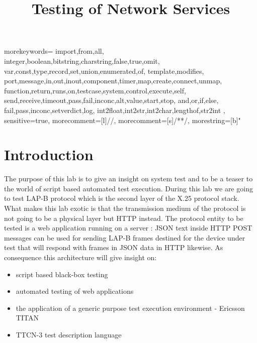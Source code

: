 \documentclass[a4paper]{article}
\title{Testing of Network Services}
\author{}
\date{}
\begin{document}
{
  morekeywords={
    import,from,all,
    integer,boolean,bitstring,charstring,false,true,omit,
    var,const,type,record,set,union,enumerated,of,
    template,modifies,
    port,message,in,out,inout,component,timer,map,create,connect,unmap,
    function,return,runs,on,testcase,system,control,execute,self,
    send,receive,timeout,pass,fail,inconc,alt,value,start,stop,
    and,or,if,else,
    fail,pass,inconc,setverdict,log,
    int2float,int2str,int2char,lengthof,str2int
  },
  sensitive=true, %
  morecomment=[l]{//}, %
  morecomment=[s]{/*}{*/}, %
  morestring=[b]" %
}
\lstset{language=TTCN3}
\lstset{frame=single}
\lstset{breaklines=true}

\maketitle

\tableofcontents

\section{Introduction}

The purpose of this lab is to give an insight on system test and to be a teaser to the world of script based automated
test execution. During this lab we are going to test LAP-B protocol which is the second layer of the X.25 protocol
stack. What makes this lab exotic is that the transmission medium of the protocol is not going to be a physical layer
but HTTP instead. The protocol entity to be tested is a web application running on a server : JSON text inside HTTP
POST messages can be used for sending LAP-B frames destined for the device under test that will respond with frames in
JSON data in HTTP likewise. As consequence this architecture will give insight on:
\begin{itemize}
    \item script based black-box testing
    \item automated testing of web applications
    \item the application of a generic purpose test execution environment - Ericsson TITAN
    \item TTCN-3 test description language
\end{itemize}
\end{document}
